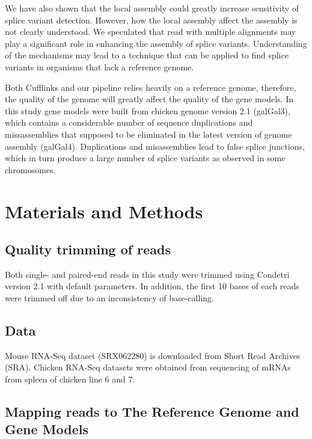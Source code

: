 \documentclass[10pt]{article}
\begin{document}
We have also shown that the local assembly could greatly increase sensitivity
of splice variant detection. However, how the local assembly affect the assembly
is not clearly understood.  We speculated that read with multiple alignments may
play a significant role in enhancing the assembly of splice variants.
Understanding of the mechanisms may lead to a technique that can be applied to
find splice variants in organisms that lack a reference genome.

Both Cufflinks and our pipeline relies heavily on a reference genome, therefore,
the quality of the genome will greatly affect the quality of the gene models.
In this study gene models were built from chicken genome version 2.1 (galGal3),
which contains a considerable number of sequence duplications and missassemblies
that supposed to be eliminated in the latest version of genome assembly
(galGal4).  Duplications and misassemblies lead to false splice junctions, which
in turn produce a large number of splice variants as observed in some
chromosomes.

\section*{Materials and Methods}

\subsection*{Quality trimming of reads}
Both single- and paired-end reads in this study were trimmed using Condetri
version 2.1 with default parameters.  In addition, the first 10 bases of each
reads were trimmed off due to an inconsistency of base-calling.


\subsection*{Data}
Mouse RNA-Seq dataset (SRX062280) is downloaded from Short Read Archives (SRA).
Chicken RNA-Seq datasets were obtained from sequencing of mRNAs from spleen of
chicken line 6 and 7.

\subsection*{Mapping reads to The Reference Genome and Gene Models}
\end{document}
